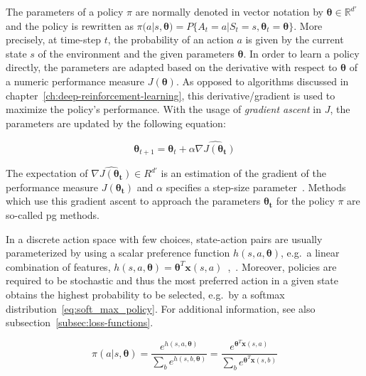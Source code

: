 \documentclass[draft,final]{vutinfth} %
\newcommand{\p}[1]{see p. #1}
\begin{document}
    The parameters of a policy $\pi$ are normally denoted in vector notation by $\boldsymbol{\theta} \in \mathbb{R}^{d'}$ and the policy is rewritten as $\pi(a|s,\boldsymbol{\theta})=P\{A_t=a|S_t=s,\boldsymbol{\theta}_t=\boldsymbol{\theta}\}$.
    More precisely, at time-step $t$, the probability of an action $a$ is given by the current state $s$ of the environment and the given parameters $\boldsymbol{\theta}$.
    In order to learn a policy directly, the parameters are adapted based on the derivative with respect to $\boldsymbol{\theta}$ of a numeric performance measure $J(\boldsymbol{\theta})$.
    As opposed to algorithms discussed in chapter~\ref{ch:deep-reinforcement-learning}, this derivative/gradient is used to maximize the policy's performance.
    With the usage of \textit{gradient ascent} in $J$, the parameters are updated by the following equation:

    \begin{equation}
        \boldsymbol{\theta}_{t+1}=\boldsymbol{\theta}_{t} + \alpha \widehat{\nabla J(\boldsymbol{\theta_t})}\label{eq:parameter_update}
    \end{equation}

    The expectation of $\widehat{\nabla J(\boldsymbol{\theta_t})} \in R^{d'}$ is an estimation of the gradient of the performance measure $J(\boldsymbol{\theta_t})$ and $\alpha$ specifies a step-size parameter~.
    Methods which use this gradient ascent to approach the parameters $\boldsymbol{\theta_t}$ for the policy $\pi$ are so-called \gls{pg} methods.

    In a discrete action space with few choices, state-action pairs are usually parameterized by using a scalar preference function $h(s,a,\boldsymbol{\theta})$, e.g.\ a linear combination of features, $h(s,a,\boldsymbol{\theta})=\boldsymbol{\theta}^T\boldsymbol{x}(s,a)$~\citep[\p{321}]{sutton_reinforcement_2018},~.
    Moreover, policies are required to be stochastic and thus the most preferred action in a given state obtains the highest probability to be selected, e.g.\ by a softmax distribution~\eqref{eq:soft_max_policy}.
    For additional information, see also subsection~\ref{subsec:loss-functions}.

    \begin{equation}
        \pi(a|s,\boldsymbol{\theta})=\frac{e^{h(s,a,\boldsymbol{\theta})}}{\sum_{b}e^{h(s,b,\boldsymbol{\theta})}}=\frac{e^{\boldsymbol{\theta}^T\boldsymbol{x}(s,a)}}{\sum_{b}e^{\boldsymbol{\theta}^T\boldsymbol{x}(s,b)}}\label{eq:soft_max_policy}
    \end{equation}
\end{document}
